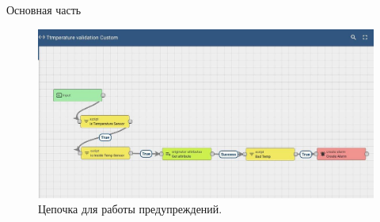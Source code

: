 \begin{chapter}{Основная часть}
    \begin{figure}[!ht]
		\centering
		\includegraphics[scale=0.5]{pictures/7.jpg}
		\caption{Цепочка для работы предупреждений.}
		\label{fig1}
	\end{figure}

\newpage
\end{chapter}
